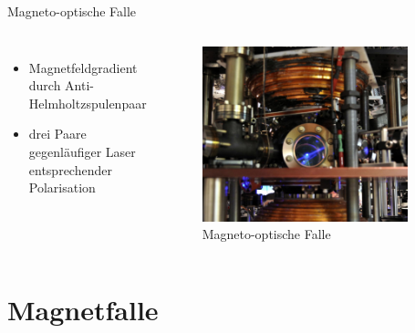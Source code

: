 \documentclass[12pt,xcolor=dvipsnames]{beamer}
\begin{document}
\begin{frame}{Magneto-optische Falle}
\begin{columns}
\begin{itemize}

	\item Magnetfeldgradient durch Anti-Helmholtzspulenpaar
		
	\item drei Paare gegenläufiger Laser entsprechender Polarisation

\end{itemize}

	\begin{figure}
		\centering
		\includegraphics[width=0.9\textwidth]{./figures/mot_columbia.jpg}
		\caption{Magneto-optische Falle \cite{columbia}}
	\end{figure}
\end{columns}
\end{frame}


\section{Magnetfalle}
\end{document}

